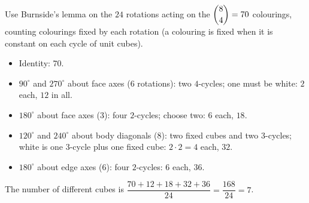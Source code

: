 Use Burnside's lemma on the $24$ rotations acting on the $\dbinom84=70$ colourings, counting colourings fixed by each rotation (a colouring is fixed when it is constant on each cycle of unit cubes).
\begin{itemize}
\item Identity: $70$.
\item $90^\circ$ and $270^\circ$ about face axes ($6$ rotations): two $4$-cycles; one must be white: $2$ each, $12$ in all.
\item $180^\circ$ about face axes ($3$): four $2$-cycles; choose two: $6$ each, $18$.
\item $120^\circ$ and $240^\circ$ about body diagonals ($8$): two fixed cubes and two $3$-cycles; white is one $3$-cycle plus one fixed cube: $2\cdot2=4$ each, $32$.
\item $180^\circ$ about edge axes ($6$): four $2$-cycles: $6$ each, $36$.
\end{itemize}
The number of different cubes is $\dfrac{70+12+18+32+36}{24}=\dfrac{168}{24}=\boxed{7}$.
